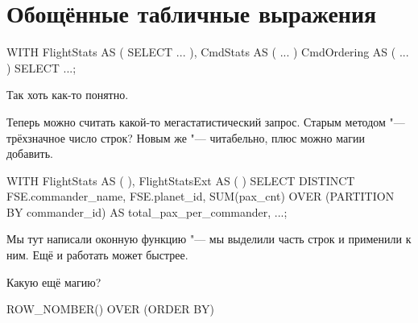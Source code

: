 \section{Обощённые табличные выражения}
\begin{sqlcode}
WITH
	FlightStats AS (
		SELECT ...
	),
	CmdStats AS (
		...
	)
	CmdOrdering AS (
		...
	)
SELECT
	...;
\end{sqlcode}
Так хоть как-то понятно.

Теперь можно считать какой-то мегастатистический запрос.
Старым методом "--- трёхзначное число строк?
Новым же "--- читабельно, плюс можно магии добавить.
\begin{sqlcode}
WITH
	FlightStats AS (
	),
	FlightStatsExt AS (
	)
SELECT
	DISTINCT FSE.commander_name, FSE.planet_id,
	SUM(pax_cnt) OVER (PARTITION BY commander_id) AS total_pax_per_commander,
	...;
\end{sqlcode}
Мы тут написали оконную функцию "--- мы выделили часть строк и применили к ним.
Ещё и работать может быстрее.

Какую ещё магию?
\begin{sqlcode}
	ROW_NOMBER() OVER (ORDER BY)
\end{sqlcode}
